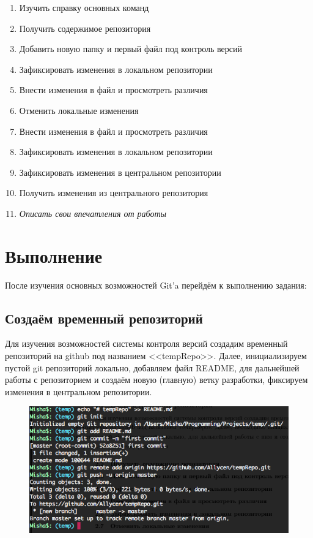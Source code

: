 \documentclass[utf8x, 12pt]{G7-32}
\begin{document}
\begin{enumerate}
	\item Изучить справку основных команд
	\item Получить содержимое репозитория
	\item Добавить новую папку и первый файл под контроль версий
	\item Зафиксировать изменения в локальном репозитории
	\item Внести изменения в файл и просмотреть различия
	\item Отменить локальные изменения
	\item Внести изменения в файл и просмотреть различия
	\item Зафиксировать изменения в локальном репозитории
	\item Зафиксировать изменения в центральном репозитории
	\item Получить изменения из центрального репозитория
	
	\medskip
	\item {\it Описать свои впечатления от работы}
\end{enumerate}



\chapter{Выполнение}


После изучения основных возможностей Git'a перейдём к выполнению задания:

\section{Создаём временный репозиторий}

Для изучения возможностей системы контроля версий создадим временный репозиторий на github под названием <<tempRepo>>. Далее, инициализируем пустой git репозиторий локально, добавляем файл README, для дальнейшей работы с репозиторием и создаём новую (главную) ветку разработки, фиксируем изменения в центральном репозитории.

\begin{figure}[hhh!]
	\begin{center}
		\includegraphics[width=12cm]{img/1}
	\end{center}
\end{figure}	
\end{document}
